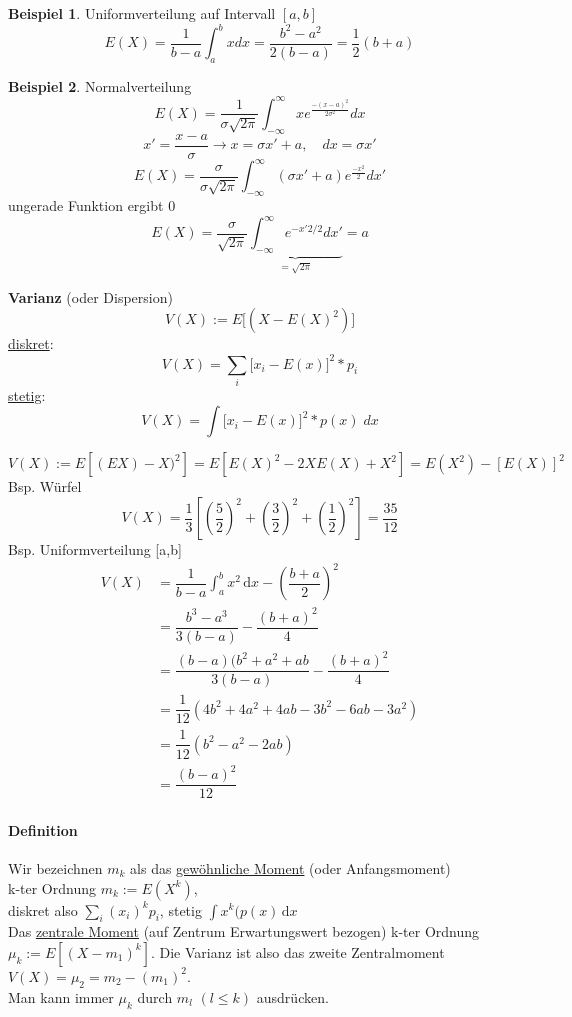 \documentclass[10pt,a4paper]{article}
\theoremstyle{definition}
\newtheorem{exmp}{Beispiel}
\begin{document}
\begin{exmp}
	Uniformverteilung auf Intervall $[a,b]$
	\[ E(X)= \frac{1}{b-a} \int_{a}^b x dx =  \frac{b^2 - a^2}{2(b-a)} = \frac{1}{2}(b+a) \]
\end{exmp}


\begin{exmp}
	Normalverteilung
\[ E(X)= \frac{1}{\sigma \sqrt{2 \pi}} \int_{-\infty}^{\infty} x e^{\frac{-(x-a)^2}{2\sigma^2}} dx \]
\[ x' = \frac{x-a}{\sigma} \rightarrow x = \sigma x' + a ,\quad dx= \sigma x' \]
\[ E(X) = \frac{\sigma}{\sigma \sqrt{2 \pi}} \int_{- \infty}^{\infty} (\sigma x' + a) e^{\frac{-x^2}{2}} dx' \]
ungerade Funktion ergibt 0
\[ E(X) = \frac{\sigma}{\sqrt{2 \pi}} \underbrace{\int_{- \infty}^{\infty} e^{-x' 2/2} dx'}_{=\sqrt{2 \pi}} = a \]
\end{exmp}

\textbf{Varianz} (oder Dispersion)
\[ V(X) := E \big[ (X-E(X)^2) \big] \]
\underline{diskret}: 
\[ V(X) = \sum\limits_{i} \big[ x_i - E(x) \big] ^2 * p_i \]
\underline{stetig}: 
\[ V(X) = \int \big[ x_i - E(x) \big] ^2 * p(x)\; dx \]


\[
V(X) := E[(EX)-X)^2] = E[E(X)^2 - 2X E(X) + X^2]  = E(X^2) - [E(X)]^2
\]
Bsp. Würfel
\[
V(X) = \dfrac{1}{3} \left[\left(\dfrac{5}{2}\right)^2 + \left(\dfrac{3}{2}\right)^2 + \left(\dfrac{1}{2}\right)^2\right] = \dfrac{35}{12}
\]
Bsp. Uniformverteilung [a,b]
\begin{align*}
V(X) &= \dfrac{1}{b-a} \int_a^b \! x^2 \, \mathrm{d}x - \left(\dfrac{b+a}{2}\right)^2\\
&= \dfrac{b^3 - a^3}{3 (b-a)} - \dfrac{(b+a)^2}{4} \\
&= \dfrac{(b-a) (b^2+a^2+ab}{3(b-a)} - \dfrac{(b+a)^2}{4}\\
&= \dfrac{1}{12} (4b^2+4a^2+4ab-3b^2-6 ab-3a^2)\\
&= \dfrac{1}{12} (b^2-a^2-2ab) \\
&= \dfrac{(b-a)^2}{12}
\end{align*}
\paragraph{Definition}
Wir bezeichnen $m_k$ als das \underline{gewöhnliche Moment} (oder Anfangsmoment)\\
k-ter Ordnung $m_k := E(X^k)$, \\
diskret also $\sum_i\left(x_i\right)^k p_i$,
stetig $\int \! x^k (p(x) \, \mathrm{d}x$
\\
Das \underline{zentrale Moment} (auf Zentrum Erwartungswert bezogen) k-ter Ordnung \\
$\mu_k := E\left[(X-m_1)^k\right]$. Die Varianz ist also das zweite Zentralmoment $V(X) = \mu_2 = m_2 - (m_1)^2$.\\
Man kann immer $\mu_k$ durch $m_l$ $\left( l \leq k\right)$ ausdrücken.
\end{document}
